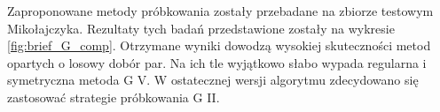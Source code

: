 Zaproponowane metody próbkowania zostały przebadane na zbiorze testowym Mikołajczyka. Rezultaty tych badań przedstawione zostały na wykresie \ref{fig:brief_G_comp}. Otrzymane wyniki dowodzą wysokiej skuteczności metod opartych o losowy dobór par. Na ich tle wyjątkowo słabo wypada regularna i symetryczna metoda G V. W ostatecznej wersji algorytmu zdecydowano się zastosować strategie próbkowania G II.
\begin{figure}
\centering

\subfigure[G IV]{
}
\end{figure}
